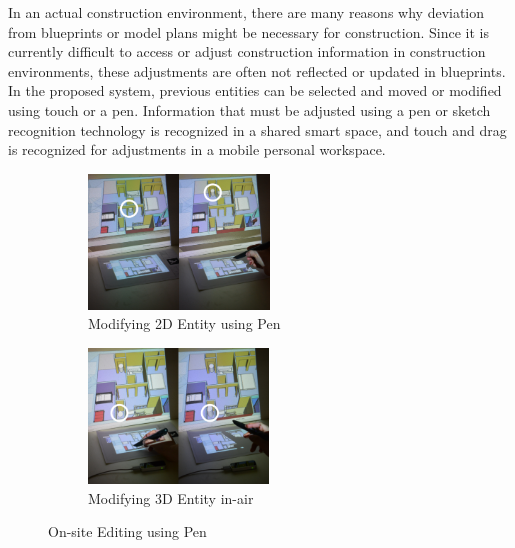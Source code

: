 In an actual construction environment, there are many reasons why deviation from blueprints or model plans might be necessary for construction. Since it is currently difficult to access or adjust construction information in construction environments, these adjustments are often not reflected or updated in blueprints. In the proposed system, previous entities can be selected and moved or modified using touch or a pen. Information that must be adjusted using a pen or sketch recognition technology is recognized in a shared smart space, and touch and drag is recognized for adjustments in a mobile personal workspace.

\begin{figure}[h!]
    \centering
        \begin{subfigure}[b]{0.49\columnwidth}
            \centering
                \includegraphics[width=1.0\columnwidth, height=3.6cm]{4-Interaction_Design/2d_move}
                \caption{Modifying 2D Entity using Pen}
                \label{fig:Pen_move}
        \end{subfigure}%
        \hfill
        \begin{subfigure}[b]{0.49\columnwidth}
            \centering
            \includegraphics[width=1.0\columnwidth, height=3.6cm]{4-Interaction_Design/3d_note}
                \caption{Modifying 3D Entity in-air}
                \label{fig:Annotation}
        \end{subfigure}
    \caption{On-site Editing using Pen}
    \label{fig:edit}
\end{figure}

